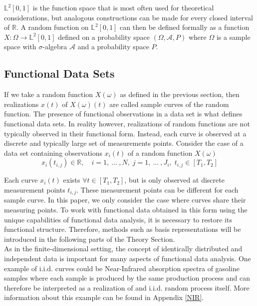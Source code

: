 \documentclass[11pt,twoside,a4paper]{article}
\begin{document}
	$\mathbb{L}^2[0,1]$ is the function space that is most often used for theoretical considerations, but analogous constructions can be made for every closed interval of $\mathbb{R}$. 
	A random function on $\mathbb{L}^2[0,1]$ can then be defined formally as a function $X : \Omega \rightarrow \mathbb{L}^2[0,1]$ defined on a probability space $(\Omega, \mathcal{A}, P)$ where $\Omega$ is a sample space with $\sigma$-algebra $\mathcal{A}$ and a probability space $P$.
	
	\subsection{Functional Data Sets}
	If we take a random function $X(\omega)$ as defined in the previous section, then realizations $x(t)$ of $X(\omega)(t)$ are called sample curves of the random function. The presence of functional observations in a data set is what defines functional data sets. In reality however,  realizations of random functions are not typically observed in their functional form. Instead, each curve is observed at a discrete and typically large set of measurements points. Consider the case of a data set containing observations $x_i(t)$ of a random function $X(\omega)$
	\begin{equation}
		x_{i}(t_{i,j}) \in \mathbb{R}, \quad i = 1,\: \dots\: ,N, \; j = 1, \: \dots \:, J_i, \; t_{i,j} \in [T_1, T_2]
	\end{equation}
	
	Each curve $x_i(t)$ exists $\forall t \in [T_1, T_2]$, but is only observed at discrete measurement points $t_{i,j}$.  These measurement points can be different for each sample curve. In this paper, we only consider the case where curves share their measuring points.
	To work with functional data obtained in this form using the unique capabilities of functional data analysis, it is necessary to restore its functional structure. Therefore, methods such as basis representations will be introduced in the following parts of the Theory Section.\\
	As in the finite-dimensional setting, the concept of identically distributed and independent data is important for many aspects of functional data analysis. One example of i.i.d. curves could be Near-Infrared absorption spectra of gasoline samples where each sample is produced by the same production process and can therefore be interpreted as a realization of and i.i.d. random process itself. More information about this example can be found in Appendix \ref{NIR}.
	
\end{document}
